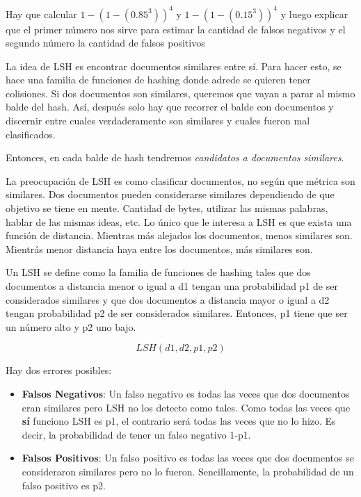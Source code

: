 \documentclass[a4paper]{article}
\newenvironment{criterio}[3]{%
    \tcolorbox[beamer,%
    noparskip,breakable,
    colback=LightCoral,colframe=DarkRed,%
    colbacklower=Tomato!75!LightCoral,%
    title=\small Criterio de Corrección: Año #1\, Cuatrimestre #2\, Oportunidad #3]}%
    {\endtcolorbox}
\begin{document}
    \begin{criterio}{2014}{2}{1}
        Hay que calcular  $1-(1-(0.85^3))^4$ y $1-(1-(0.15^3))^4$ y luego explicar que el primer número nos sirve para estimar la cantidad de falsos negativos y el segundo número la cantidad de falsos positivos
    \end{criterio}
    
    La idea de LSH es encontrar documentos similares entre sí. Para hacer esto, se hace una familia de funciones de hashing donde adrede se quieren tener colisiones. Si dos documentos son similares, queremos que vayan a parar al mismo balde del hash. Así, después solo hay que recorrer el balde con documentos y discernir entre cuales verdaderamente son similares y cuales fueron mal clasificados.

    Entonces, en cada balde de hash tendremos \textit{candidatos a documentos similares}.

    La preocupación de LSH es como clasificar documentos, no según que métrica son similares. Dos documentos pueden considerarse similares dependiendo de que objetivo se tiene en mente. Cantidad de bytes, utilizar las mismas palabras, hablar de las mismas ideas, etc. Lo único que le interesa a LSH es que exista una función de distancia. Mientras más alejados los documentos, menos similares son. Mientrás menor distancia haya entre los documentos, más similares son.

    Un LSH se define como la familia de funciones de hashing tales que dos documentos a distancia menor o igual a d1 tengan una probabilidad p1 de ser considerados similares y que dos documentos a distancia mayor o igual a d2 tengan probabilidad p2 de ser considerados similares. Entonces, p1 tiene que ser un número alto y p2 uno bajo.

    $$LSH(d1,d2,p1,p2)$$

    Hay dos errores posibles:

    \begin{itemize}
        \item \textbf{Falsos Negativos}: Un falso negativo es todas las veces que dos documentos eran similares pero LSH no los detecto como tales. Como todas las veces que \textbf{sí} funciono LSH es p1, el contrario será todas las veces que no lo hizo. Es decir, la probabilidad de tener un falso negativo 1-p1.

        \item \textbf{Falsos Positivos}: Un falso positivo es todas las veces que dos documentos se consideraron similares pero no lo fueron. Sencillamente, la probabilidad de un falso positivo es p2.
    \end{itemize}
\end{document}
